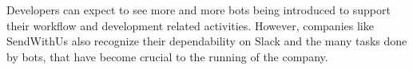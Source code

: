 \documentclass{sig-alternate}
\newcommand{\cl}[1]{\textcolor{blue}{{\it [Carly says: #1]}}}
\newcommand{\cp}[1]{\textcolor{red}{{\it [Cassie says: #1]}}}
\newcommand{\cl}[1]{}
\newcommand{\cp}[1]{}
\begin{document}
\begin{mdframed}
Developers can expect to see more and more bots being introduced to support their workflow and development related activities. However, companies like SendWithUs also recognize their dependability on Slack and the many tasks done by bots, that have become crucial to the running of the company.

\end{mdframed}


 
\end{document}
